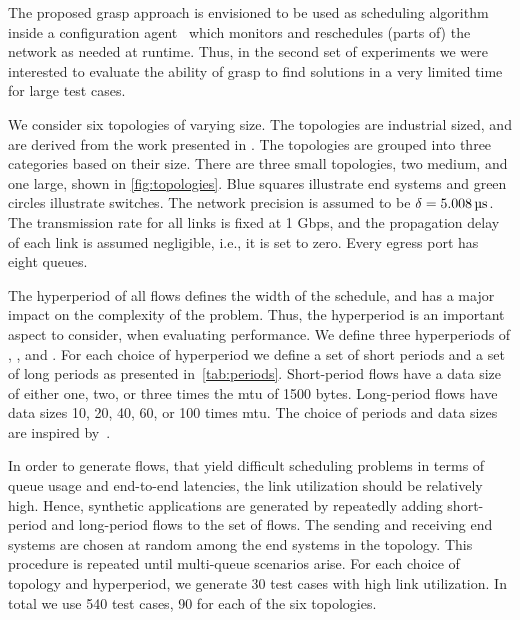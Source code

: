 The proposed \gls{grasp} approach is envisioned to be used as scheduling algorithm inside a configuration agent~\cite{gutierrez2015} which monitors and reschedules (parts of) the network as needed at runtime. Thus, in the second set of experiments we were interested to evaluate the ability of \gls{grasp} to find solutions in a very limited time for large test cases. 

We consider six topologies of varying size. The topologies are industrial sized, and are derived from the work presented in \cite{oliver14}. The topologies are grouped into three categories based on their size. There are three small topologies, two medium, and one large, shown in \autoref{fig:topologies}. Blue squares illustrate end systems and green circles illustrate switches.
The network precision is assumed to be $\delta = \SI{5.008}{\micro\second}$. The transmission rate for all links is fixed at 1 Gbps, and the propagation delay of each link is assumed negligible, i.e., it is set to zero. Every egress port has eight queues.

The hyperperiod of all flows defines the width of the schedule, and has a major impact on the complexity of the problem. Thus, the hyperperiod is an important aspect to consider, when evaluating performance. We define three hyperperiods of , , and . For each choice of hyperperiod we define a set of short periods and a set of long periods as presented in~\autoref{tab:periods}.
Short-period flows have a data size of either one, two, or three times the \gls{mtu} of 1500 bytes. Long-period flows have data sizes 10, 20, 40, 60, or 100 times \gls{mtu}. The choice of periods and data sizes are inspired by~\cite{craciunas16}.

In order to generate flows, that yield difficult scheduling problems in terms of queue usage and end-to-end latencies, the link utilization should be relatively high. Hence, synthetic applications are generated by repeatedly adding short-period and long-period flows to the set of flows. The sending and receiving end systems are chosen at random among the end systems in the topology. This procedure is repeated until multi-queue scenarios arise.
For each choice of topology and hyperperiod, we generate 30 test cases with high link utilization. In total we use 540 test cases, 90 for each of the six topologies.

